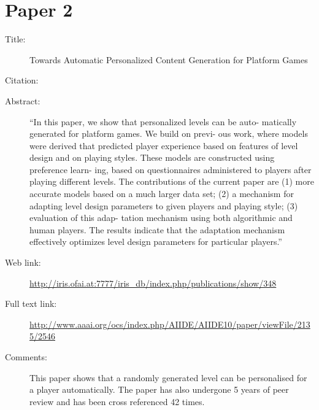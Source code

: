 \documentclass{scrartcl}
\begin{document}
\section*{Paper 2}
\begin{description}
\item[Title:] Towards Automatic Personalized Content Generation for Platform Games
\item[Citation:] \cite{Shaker}
\item[Abstract:] ``In this paper, we show that personalized levels can be auto- matically
generated for platform games. We build on previ- ous work, where models
were derived that predicted player experience based on features of
level design and on playing styles. These models are constructed using
preference learn- ing, based on questionnaires administered to players
after playing different levels. The contributions of the current paper are (1) more accurate models based on a much larger data set; (2) a
mechanism for adapting level design parameters to given players and
playing style; (3) evaluation of this adap- tation mechanism using both
algorithmic and human players. The results indicate that the adaptation
mechanism effectively optimizes level design parameters for particular
players.''
\item[Web link:] \url{http://iris.ofai.at:7777/iris_db/index.php/publications/show/348}
\item[Full text link:] \url{http://www.aaai.org/ocs/index.php/AIIDE/AIIDE10/paper/viewFile/2135/2546}
\item[Comments:] This paper shows that a randomly generated level can be personalised for a player automatically. The paper has also undergone 5 years of peer review and has been cross referenced 42 times.
\end{description}
\end{document}
